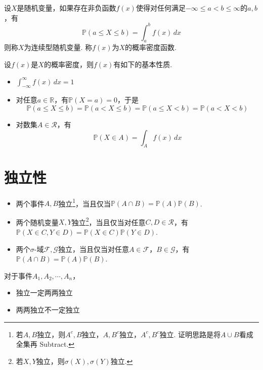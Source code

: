 \begin{definition}[连续型随机变量]
    设$X$是随机变量，如果存在非负函数$f(x)$使得对任何满足$-\infty\le a<b\le \infty$的$a,b$，有
    $$
        \mathbb{P}(a\le X\le b)=\int_a^b f(x) \, dx
    $$
    则称$X$为连续型随机变量. 称$f(x)$为$X$的概率密度函数.
\end{definition}

设$f(x)$是$X$的概率密度，则$f(x)$有如下的基本性质.
\begin{itemize}
    \item $\int_{-\infty}^{\infty} f(x) \, dx=1$
    \item 对任意$a\in\mathbb{R}$，有$\mathbb{P}(X=a)=0$，于是
          $$
              \mathbb{P}(a\le X\le b)=\mathbb{P}(a<X\le b)=\mathbb{P}(a\le X<b)=\mathbb{P}(a<X<b)
          $$
    \item 对数集$A\in\mathcal{R}$，有
          $$
              \mathbb{P}(X\in A)=\int_A f(x) \, dx
          $$
\end{itemize}

\section{独立性}

\begin{definition}[独立性]
    \begin{itemize}
        \item 两个事件$A,B$独立\footnote{若$A,B$独立，则$A^c,B$独立，$A,B^c$独立，$A^c,B^c$独立. 证明思路是将$A\cup B$看成全集再 Subtract.}，当且仅当$\mathbb{P}(A\cap B)=\mathbb{P}(A)\mathbb{P}(B)$.
        \item 两个随机变量$X,Y$独立\footnote{若$X,Y$独立，则$\sigma(X),\sigma(Y)$独立.}，当且仅当对任意$C,D\in\mathcal{R}$，有$\mathbb{P}(X\in C, Y\in D)=\mathbb{P}(X\in C)\mathbb{P}(Y\in D)$.
        \item 两个$\sigma$-域$\mathcal{F},\mathcal{G}$独立，当且仅当对任意$A\in\mathcal{F}$，$B\in\mathcal{G}$，有$\mathbb{P}(A\cap B)=\mathbb{P}(A)\mathbb{P}(B)$.
    \end{itemize}
\end{definition}

\begin{kaobox}[frametitle="独立"与"两两独立"]
    对于事件$A_1,A_2,\cdots,A_n$，
    \begin{itemize}
        \item 独立一定两两独立
        \item 两两独立不一定独立
    \end{itemize}
\end{kaobox}

